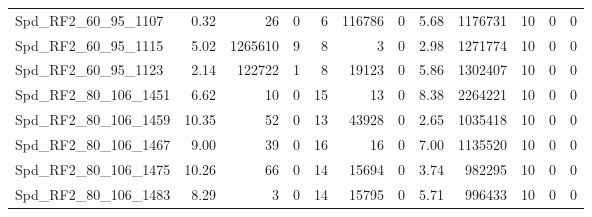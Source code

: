 \begin{longtable}[c]{@{}lrrrrrrrrrrr@{}}
Spd\_RF2\_60\_95\_1107        & 0.32                   & 26                      & 0                       & 6                      & 116786                  & 0                       & 5.68                    & 1176731                  & 10                       & 0                        & 0                        \\
Spd\_RF2\_60\_95\_1115        & 5.02                   & 1265610                 & 9                       & 8                      & 3                       & 0                       & 2.98                    & 1271774                  & 10                       & 0                        & 0                        \\
Spd\_RF2\_60\_95\_1123        & 2.14                   & 122722                  & 1                       & 8                      & 19123                   & 0                       & 5.86                    & 1302407                  & 10                       & 0                        & 0                        \\
Spd\_RF2\_80\_106\_1451       & 6.62                   & 10                      & 0                       & 15                     & 13                      & 0                       & 8.38                    & 2264221                  & 10                       & 0                        & 0                        \\
Spd\_RF2\_80\_106\_1459       & 10.35                  & 52                      & 0                       & 13                     & 43928                   & 0                       & 2.65                    & 1035418                  & 10                       & 0                        & 0                        \\
Spd\_RF2\_80\_106\_1467       & 9.00                   & 39                      & 0                       & 16                     & 16                      & 0                       & 7.00                    & 1135520                  & 10                       & 0                        & 0                        \\
Spd\_RF2\_80\_106\_1475       & 10.26                  & 66                      & 0                       & 14                     & 15694                   & 0                       & 3.74                    & 982295                   & 10                       & 0                        & 0                        \\
Spd\_RF2\_80\_106\_1483       & 8.29                   & 3                       & 0                       & 14                     & 15795                   & 0                       & 5.71                    & 996433                   & 10                       & 0                        & 0                        \\

\end{longtable}
